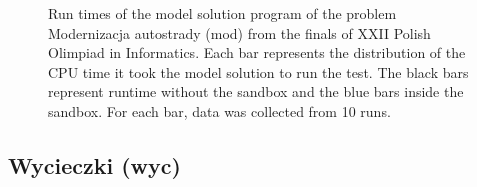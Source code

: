 \documentclass[en]{pracamgr}
\begin{document}
\begin{appendices}
\begin{figure}[H]
\caption{Run times of the model solution program of the problem Modernizacja autostrady (mod) from the finals of XXII Polish Olimpiad in Informatics. Each bar represents the distribution of the CPU time it took the model solution to run the test. The black bars represent runtime without the sandbox and the blue bars inside the sandbox. For each bar, data was collected from 10 runs.}
\label{figure:mod_model_solution_cpu_time}
\end{figure}

\subsection{Wycieczki (wyc)}


\end{appendices}
\end{document}

